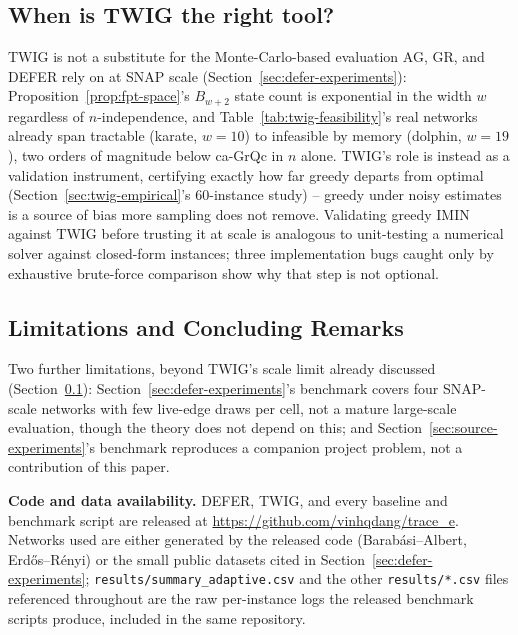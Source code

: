 \documentclass[ijoc,sglanonrev]{informs4}
\begin{document}
\subsection{When is TWIG the right tool?}\label{sec:discussion-twig}

TWIG is not a substitute for the Monte-Carlo-based evaluation AG, GR, and
DEFER rely on at SNAP scale (Section~\ref{sec:defer-experiments}):
Proposition~\ref{prop:fpt-space}'s $B_{w+2}$ state count is exponential in
the width $w$ regardless of $n$-independence, and
Table~\ref{tab:twig-feasibility}'s real networks already span tractable
(karate, $w=10$) to infeasible by memory (dolphin, $w=19$), two orders of
magnitude below ca-GrQc in $n$ alone. TWIG's role is instead as a
validation instrument, certifying exactly how far greedy departs from
optimal (Section~\ref{sec:twig-empirical}'s 60-instance study) -- greedy
under noisy estimates is a source of bias more sampling does not remove.
Validating greedy IMIN against TWIG before trusting it at scale is
analogous to unit-testing a numerical solver against closed-form
instances; three implementation bugs caught only by exhaustive
brute-force comparison show why that step is not optional.

\subsection{Limitations and Concluding Remarks}\label{sec:conclusion}

Two further limitations, beyond TWIG's scale limit already discussed
(Section~\ref{sec:discussion-twig}): Section~\ref{sec:defer-experiments}'s
benchmark covers four SNAP-scale networks with few live-edge draws per
cell, not a mature large-scale evaluation, though the theory does not
depend on this; and Section~\ref{sec:source-experiments}'s benchmark
reproduces a companion project problem, not a contribution of this paper.

\textbf{Code and data availability.} DEFER, TWIG, and every baseline and
benchmark script are released at
\url{https://github.com/vinhqdang/trace_e}. Networks used are either
generated by the released code (Barab\'asi--Albert, Erd\H{o}s--R\'enyi) or
the small public datasets cited in
Section~\ref{sec:defer-experiments}; \texttt{results/summary\_adaptive.csv}
and the other \texttt{results/*.csv} files referenced throughout are the
raw per-instance logs the released benchmark scripts produce,
included in the same repository.

\end{document}
